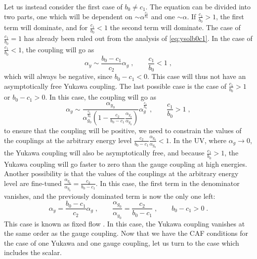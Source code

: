 Let us instead consider the first case of $b_0\neq c_1$. The equation can be divided into two parts, one which will be dependent on $\sim\alpha^{\frac{c_1}{b_0}}$ and one $\sim\alpha$. If $\frac{c_1}{b_0}>1$, the first term will dominate, and for $\frac{c_1}{b_0}<1$ the second term will dominate. The case of $\frac{c_1}{b_0}=1$ has already been ruled out from the analysis of \eqref{eq:ysolb0c1}. In the case of $\frac{c_1}{b_0}<1$, the coupling will go as \begin{equation}
    \alpha_y\sim\frac{b_0-c_1}{c_2}\alpha_g\;,\quad\quad \frac{c_1}{b_0}<1\;,
\end{equation}
which will always be negative, since $b_0-c_1<0$. This case will thus not have an asymptotically free Yukawa coupling. The last possible case is the case of $\frac{c_1}{b_0}>1$ or $b_0-c_1>0$. In this case, the coupling will go as
\begin{equation}
    \alpha_y\sim\frac{\alpha_{y_0}}{ \alpha_{g_0}^{\frac{c_1}{b_0}}\left(1-\frac{c_2}{b_0-c_1}\frac{\alpha_{y_0}}{\alpha_{g_0}}\right)}\alpha_g^{\frac{c_1}{b_0}}\;,\quad\quad \frac{c_1}{b_0}>1\;,
\end{equation}
to ensure that the coupling will be positive, we need to constrain the values of the couplings at the arbitrary energy level $\frac{c_2}{b_0-c_1}\frac{\alpha_{y_0}}{\alpha_{g_0}}<1$. In the UV, where $\alpha_g\to 0$, the Yukawa coupling will also be asymptotically free, and because $\frac{c_1}{b_0}>1$, the Yukawa coupling will go faster to zero than the gauge coupling at high energies. Another possibility is that the values of the couplings at the arbitrary energy level are fine-tuned $\frac{\alpha_{g_0}}{\alpha_{y_0}}=\frac{c_2}{b_0-c_1}$. In this case, the first term in the denominator vanishes, and the previously dominated term is now the only one left:
\begin{equation}
    \alpha_y=\frac{b_0-c_1}{ c_2 }\alpha_g\;,\quad\quad \frac{\alpha_{g_0}}{\alpha_{y_0}}=\frac{c_2}{b_0-c_1}\;,\quad\quad b_0-c_1>0\;.\label{eq:ygfixed2}
\end{equation}
This case is known as fixed flow \cite{SoftenedGravity}. In this case, the Yukawa coupling vanishes at the same order as the gauge coupling. Now that we have the CAF conditions for the case of one Yukawa and one gauge coupling, let us turn to the case which includes the scalar.

